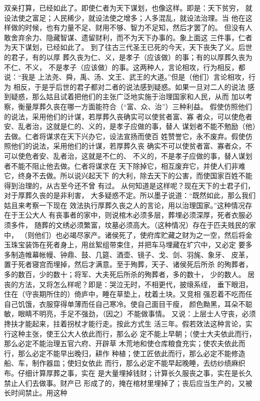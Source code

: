 \documentclass[12pt,UTF8]{ctexbook}
\begin{document}
双亲打算，已经如此了。即使仁者为天下谋划，也像这样。即是：天下贫穷， 
就设法使之富足；人民稀少，就设法使之增多；人多混乱，就设法治理。当 
他在这样做的时候，也有力量不足、财用不够、智力不足知，然后才罢了的。 
但没有人敢舍弃余力、隐藏智谋、遗留财利，而不为天下办事的。象上面这 
三件事，仁者为天下谋划，已经如此了。 
到了往古三代圣王已死的今天，天下丧失了义。后世的君子，有的以厚 
葬久丧为仁、义，是孝子（应该做）的事；有的以厚葬久丧为不仁、不义， 
不是孝子（应该做）的事。这两种人，言论相攻，行为相反，都说：“我是 
上法尧、舜，禹、汤、文王、武王的大道。”但是（他们）言论相攻，行为 
相反，于是乎后世的君子都对二者的说法感到疑惑。如果一旦对二人的说法 
感到疑惑，那么姑且试着把他们的主张广泛地实施于治理国家和人民，从而 
加以考察，衡量厚葬久丧在哪一方面能符合（“富、众、治”）三种利益。 
假使仿照他们的说法，采用他们的计谋，若厚葬久丧确实可以使贫者富、寡 
者众，可以使危者安、乱者治，这就是仁的、义的，是孝子应做的事，替人 
谋划者不能不勉励（他）去做。仁者将谋求在天下兴办它，设法宣扬而使百 
姓赞誉它，永不废弃。假使仿照他们的说法，采用他们的计谋，若厚葬久丧 
确实不可以使贫者富、寡者众，不可以使危者安、乱者治，这就是不仁的、 
不义的，不是孝子应做的事，替人谋划者不能不阻止他去做。仁者将谋求在 
天下除掉它，相互废弃它，并使人们非难它，终身不去做。所以说兴起天下 
的大利，除去天下的公害，而使国家百姓不能得到治理的，从古至今还不曾 
有过。 
从何知道是这样呢？现在天下的士君子们，对于厚葬久丧的是非利害， 
大多疑惑不定。所以墨子说道：“既然如此，那么我们姑且来考察一下现在 
效法执行厚葬久丧之人的言论，用以治理国家。”这种情况存在于王公大人 
有丧事者的家中，则说棺木必须多层，葬埋必须深厚，死者衣服必须多件， 
随葬的文绣必须繁富，坟墓必须高大。（这种情况）存在于匹夫贱民的家中， 
（则他们）也必竭尽家产。诸侯死了，使府库贮藏之财为之一空，然后将金 
玉珠宝装饰在死者身上，用丝絮组带束住，并把车马埋藏在圹穴中，又必定 
要多多制造帷幕帐幔、钟鼎、鼓、几筵、酒壶、镜子、戈、剑、羽旄、象牙、 
皮革，置于死者寝宫而埋掉，然后才满意。至于殉葬，天子、诸侯死后所杀 
的殉葬者，多的数百，少的数十；将军、大夫死后所杀的殉葬者，多的数十， 
少的数人。 
居丧的方法，又将怎么样呢？即是：哭泣无时，不相更代，披缞系绖， 
垂下眼泪，住在（守丧期所住的）倚庐中，睡在草垫上，枕着土块。又竞相 
强忍着不吃而任自己饥饿，衣服穿得单薄而任自己寒冷。使自己面目干瘦， 
颜色黝黑，耳朵不聪敏，眼睛不明亮，手足不强劲，（因之）不能做事情。 
又说：上层士人守丧，必须搀扶才能起来，拄着拐杖才能行走。按此方式生 
活三年。假若效法这种言论，实行这种主张，使王公大人依此而行，那么必 
定不能上早朝；（使士大夫依此而行，那么必定不能治理五官六府、开辟草 
木荒地和使仓库粮食充实；使农夫依此而行，那么必定不能早出晚归，耕作 
种植；使工匠依此而行，那么必定不能修造船、车，制作器皿；使妇女依此 
而行，那么必定不能早起晚睡，去纺纱绩麻织布。仔细计算厚葬之事，实在 
是大量埋掉钱财；计算长久服丧之事，实在是长久禁止人们去做事。财产已 
形成了的，掩在棺材里埋掉了；丧后应当生产的，又被长时间禁止。用这种 
\end{document}
